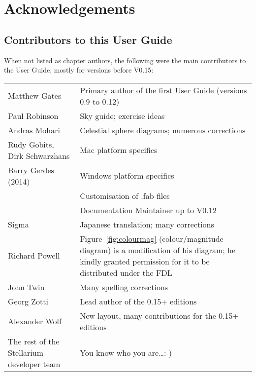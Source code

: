 \chapter{Acknowledgements}

\section{Contributors to this User Guide}
\label{sec:Contributors}
When not listed as chapter authors, the following were the main contributors to the User Guide, mostly for versions before V0.15:

\noindent%
\begin{tabularx}{\textwidth}{l|X}
\toprule
Matthew Gates  & Primary author of the first User Guide (versions 0.9 to 0.12)\\
Paul Robinson  &Sky guide; exercise ideas\\
Andras Mohari  &Celestial sphere diagrams; numerous corrections\\
Rudy Gobits, Dirk Schwarzhans & Mac platform specifics\\
Barry Gerdes (\textdagger{}2014)  &Windows platform specifics \\
               &Customisation of .fab files\\
               &Documentation Maintainer up to V0.12\\
Sigma          &Japanese translation; many corrections\\ %
Richard Powell & Figure~\ref{fig:colourmag} (colour/magnitude diagram) is a modification of his diagram; 
                 he kindly granted permission for it to be distributed under the FDL\\
John Twin      & Many spelling corrections \\\midrule
Georg Zotti    & Lead author of the 0.15+ editions\\
Alexander Wolf & New layout, many contributions for the 0.15+ editions\\
The rest of the Stellarium developer team & You know who you are\ldots :-)\tabularnewline
\bottomrule
\end{tabularx}


